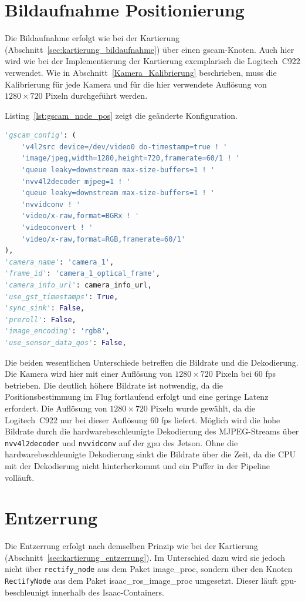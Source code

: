 \section{Bildaufnahme Positionierung}
\label{sec:pos_bildaufnahme}
Die Bildaufnahme erfolgt wie bei der Kartierung (Abschnitt~\ref{sec:kartierung_bildaufnahme}) über einen gscam-Knoten.
Auch hier wird wie bei der Implementierung der Kartierung exemplarisch die Logitech~C922 verwendet.
Wie in Abschnitt~\ref{Kamera_Kalibrierung} beschrieben, muss die Kalibrierung für jede Kamera und für die hier verwendete 
Auflösung von $1280 \times 720$ Pixeln durchgeführt werden.


Listing~\ref{lst:gscam_node_pos} zeigt die geänderte Konfiguration.

\begin{lstlisting}[language=Python, caption={Parameter des gscam-Knotens zur Bildaufnahme im Flug}, label={lst:gscam_node_pos}]
'gscam_config': (
    'v4l2src device=/dev/video0 do-timestamp=true ! '
    'image/jpeg,width=1280,height=720,framerate=60/1 ! '
    'queue leaky=downstream max-size-buffers=1 ! '
    'nvv4l2decoder mjpeg=1 ! '
    'queue leaky=downstream max-size-buffers=1 ! '
    'nvvidconv ! '
    'video/x-raw,format=BGRx ! '
    'videoconvert ! '
    'video/x-raw,format=RGB,framerate=60/1'
),
'camera_name': 'camera_1',
'frame_id': 'camera_1_optical_frame',
'camera_info_url': camera_info_url,
'use_gst_timestamps': True,
'sync_sink': False,
'preroll': False,
'image_encoding': 'rgb8',
'use_sensor_data_qos': False,
\end{lstlisting}

Die beiden wesentlichen Unterschiede betreffen die Bildrate und die Dekodierung.
Die Kamera wird hier mit einer Auflösung von $1280 \times 720$ Pixeln bei $60$ \gls{fps} betrieben.
Die deutlich höhere Bildrate ist notwendig, da die Positionsbestimmung im Flug fortlaufend erfolgt und eine geringe Latenz erfordert.
Die Auflösung von $1280 \times 720$ Pixeln wurde gewählt, da die Logitech~C922 nur bei dieser Auflösung $60$ \gls{fps} liefert.
Möglich wird die hohe Bildrate durch die hardwarebeschleunigte Dekodierung des MJPEG-Streams über \texttt{nvv4l2decoder} und \texttt{nvvidconv} 
auf der \gls{gpu} des Jetson.
Ohne die hardwarebeschleunigte Dekodierung sinkt die Bildrate über die Zeit, da die CPU mit der Dekodierung 
nicht hinterherkommt und ein Puffer in der Pipeline volläuft.


\section{Entzerrung}
\label{sec:pos_entzerrung}
Die Entzerrung erfolgt nach demselben Prinzip wie bei der Kartierung (Abschnitt~\ref{sec:kartierung_entzerrung}).
Im Unterschied dazu wird sie jedoch nicht über \texttt{rectify\_node} aus dem Paket image\_proc, sondern über den Knoten \texttt{RectifyNode} aus 
dem Paket isaac\_ros\_image\_proc umgesetzt.
Dieser läuft \gls{gpu}-beschleunigt innerhalb des Isaac-Containers.

